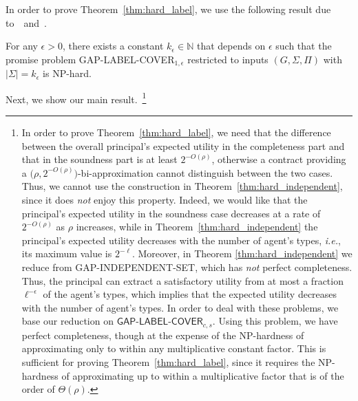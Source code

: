 In order to prove Theorem~\ref{thm:hard_label}, we use the following result due to~\citet{raz1998parallel}~and~\citet{arora1998proof}.

\begin{theorem}\label{thm:hard_gap_label}
	For any $\epsilon > 0$, there exists a constant $k_\epsilon \in \mathbb{N}$ that depends on $\epsilon$ such that the promise problem \textnormal{\textsf{GAP-LABEL-COVER}}$_{1,\epsilon}$ restricted to inputs $(G, \Sigma, \Pi)$ with $|\Sigma| = k_\epsilon$ is \textnormal{\textsf{NP}}-hard.
\end{theorem}

Next, we show our main result.~\footnote{
In order to prove Theorem~\ref{thm:hard_label}, we need that the difference between the overall principal's expected utility in the completeness part and that in the soundness part is at least $2^{-O(\rho)}$, otherwise a contract providing a $\big(\rho, 2^{-O(\rho)}\big)$-bi-approximation cannot distinguish between the two cases.
%
Thus, we cannot use the construction in Theorem~\ref{thm:hard_independent}, since it does \emph{not} enjoy this property.
%
Indeed, we would like that the principal's expected utility in the soundness case decreases at a rate of $2^{-O(\rho)}$ as $\rho$ increases, while in Theorem~\ref{thm:hard_independent} the principal's expected utility decreases with the number of agent's types, \emph{i.e.}, its maximum value is $2^{-\ell}$.
%
Moreover, in Theorem \ref{thm:hard_independent} we reduce from \textsf{GAP-INDEPENDENT-SET}, which has \emph{not} perfect completeness.
%
Thus, the principal can extract a satisfactory utility from at most a fraction $\ell^{-\epsilon}$ of the agent's types, which implies that the expected utility decreases with the number of agent's types.
%
In order to deal with these problems, we base our reduction on $\textsf{GAP-LABEL-COVER}_{c,s}$.
%
Using this problem, we have perfect completeness, though at the expense of the \textsf{NP}-hardness of approximating only to within any multiplicative constant factor.
%
This is sufficient for proving Theorem~\ref{thm:hard_label}, since it requires the \textsf{NP}-hardness of approximating up to within a multiplicative factor that is of the order of $\Theta(\rho)$.}


